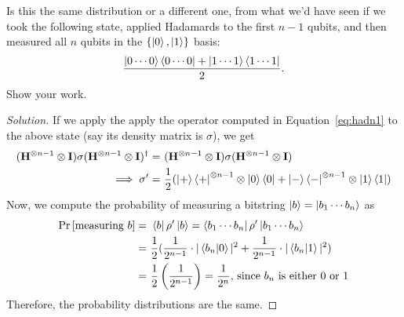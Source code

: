 \begin{solution}[label=ques:2b]
  \begin{question}
    Is this the same distribution or a different one, from what we'd have seen if we took the following state, applied Hadamards to the first $n-1$ qubits, and then measured all $n$ qubits in the $\{\ket{0}, \ket{1}\}$ basis:  $$\frac{\ket{0\cdots 0}\bra{0\cdots0} +	\ket{1\cdots1}\bra{1\cdots1}}{2}.$$ Show your work.
  \end{question}
  \tcblower{}
  \begin{proof}[Solution]
    If we apply the apply the operator computed in Equation~\ref{eq:hadn1} to the above state (say its density matrix is $\sigma$), we get
    \begin{equation}
      \begin{split}
        (\mathbf{H}^{\otimes n - 1}\otimes \mathbf{I})\sigma(\mathbf{H}^{\otimes n - 1}\otimes \mathbf{I})^\dagger = &\ (\mathbf{H}^{\otimes n - 1}\otimes \mathbf{I})\sigma(\mathbf{H}^{\otimes n - 1}\otimes \mathbf{I})\\
        \implies \sigma' = &\ \frac{1}{2}(\ket{+}\bra{+}^{\otimes n - 1}\otimes\ket{0}\bra{0} + \ket{-}\bra{-}^{\otimes n - 1}\otimes\ket{1}\bra{1})
      \end{split}
      \label{eq:hadn1sig}
    \end{equation}
    Now, we compute the probability of measuring a bitstring $\ket{b} = \ket{b_1\cdots b_n}$ as
    \begin{equation}
      \begin{split}
        \Pr\left[ \text{measuring }b \right] = &\ \bra{b}\rho'\ket{b} = \bra{b_1\cdots b_n}\rho'\ket{b_1\cdots b_n}\\
        = &\ \frac{1}{2}(\frac{1}{2^{n - 1}}\cdot|\braket{b_n|0}|^2 + \frac{1}{2^{n - 1}}\cdot|\braket{b_n|1}|^2)\\
        = &\ \frac{1}{2}\left(\frac{1}{2^{n - 1}}\right) = \frac{1}{2^n}\text{, since $b_n$ is either $0$ or $1$}
      \end{split}
      \label{eq:hadn1meassig}
    \end{equation}
    Therefore, the probability distributions are the same.
  \end{proof}
\end{solution}

